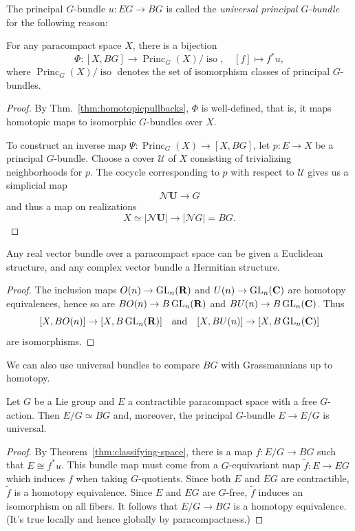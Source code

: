 \documentclass[a4paper,openany]{scrbook}
\DeclareMathOperator{\Princ}{Princ}
\newcommand{\nerve}{\mathcal N}
\begin{document}
The principal $G$-bundle $u\colon EG \to BG$ is called the \emph{universal principal $G$-bundle} for the following reason:

\begin{thm}\label{thm:classifying-space}
For any paracompact space $X$, there is a bijection
\[
\Phi\colon [X,BG] \to \Princ_G(X)/\operatorname{iso}, \quad [f] \mapsto f^*u,
\]
where $\Princ_G(X)/\operatorname{iso}$ denotes the set of isomorphism classes of principal $G$-bundles.
\end{thm}
\begin{proof}
By Thm.~\ref{thm:homotopicpullbacks}, $\Phi$ is well-defined, that is, it maps homotopic maps to isomorphic $G$-bundles over $X$.

To construct an inverse map $\Psi\colon \Princ_G(X) \to [X,BG]$, let $p\colon E \to X$ be a principal $G$-bundle. Choose a cover $\mathcal U$ of $X$ consisting of trivializing neighborhoods for $p$. The cocycle corresponding to $p$ with respect to $\mathcal U$ gives us a simplicial map
\[
\nerve \mathbf U \to G
\]
and thus a map on realizations
\[
X \simeq |\nerve\mathbf U| \to |\nerve G| = BG.
\]
\end{proof}

\begin{corollary}\label{cor:euclideanstructure}
Any real vector bundle over a paracompact space can be given a Euclidean structure, and any complex vector bundle a Hermitian structure. 
\end{corollary}
\begin{proof}
The inclusion maps $O(n) \to \operatorname{GL}_n(\mathbf R)$ and $U(n) \to \operatorname{GL}_n(\mathbf C)$ are homotopy equivalences, hence so are $BO(n) \to B\operatorname{GL}_n(\mathbf R)$ and $BU(n) \to B\operatorname{GL}_n(\mathbf C)$. Thus
\[
[X,BO(n)] \to [X,B\operatorname{GL}_n(\mathbf R)] \quad \text{and} \quad [X,BU(n)] \to [X,B\operatorname{GL}_n(\mathbf C)]
\]
are isomorphisms.
\end{proof}

We can also use universal bundles to compare $BG$ with Grassmannians up to homotopy.

\begin{corollary}\label{cor:characterizationfouniversalGspaces}
Let $G$ be a Lie group and $E$ a contractible paracompact space with a free $G$-action. Then $E/G \simeq BG$ and, moreover, the principal $G$-bundle $E \to E/G$ is universal.
\end{corollary}
\begin{proof}
By Theorem~\ref{thm:classifying-space}, there is a map $f\colon E/G \to BG$ such that $E \cong f^*u$. This bundle map must come from a $G$-equivariant map $\tilde f\colon E \to EG$ which induces $f$ when taking $G$-quotients. Since both $E$ and $EG$ are contractible, $\tilde f$ is a homotopy equivalence. Since $E$ and $EG$ are $G$-free, $\tilde f$ induces an isomorphism on all fibers. It follows that $E/G \to BG$ is a homotopy equivalence. (It's true locally and hence globally by paracompactness.)
\end{proof}
\end{document}
